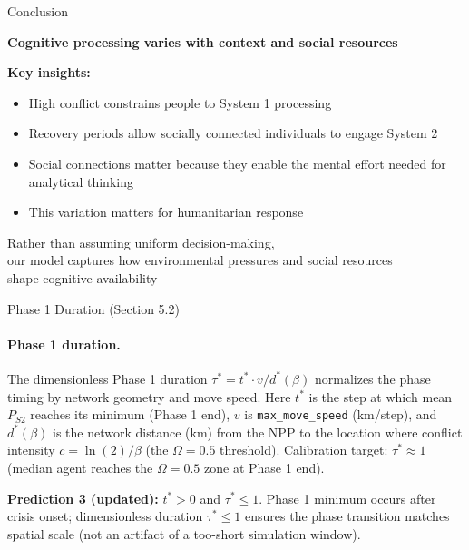 \documentclass[aspectratio=169]{beamer}
\begin{document}
\begin{frame}{Conclusion}

\begin{center}
\Large
\textbf{Cognitive processing varies with context and social resources}
\end{center}

\vspace{1em}

\textbf{Key insights:}
\begin{itemize}
    \item High conflict constrains people to System 1 processing
    \item Recovery periods allow socially connected individuals to engage System 2
    \item Social connections matter because they enable the mental effort needed for analytical thinking
    \item This variation matters for humanitarian response
\end{itemize}

\vspace{1em}

\begin{center}
\large
Rather than assuming uniform decision-making,\\
our model captures how environmental pressures and social resources\\
shape cognitive availability
\end{center}

\end{frame}

\begin{frame}{Phase 1 Duration (Section 5.2)}

\paragraph{Phase 1 duration.} The dimensionless Phase 1 duration
$\tau^* = t^* \cdot v / d^*(\beta)$ normalizes the phase timing by
network geometry and move speed. Here $t^*$ is the step at which
mean $P_{S2}$ reaches its minimum (Phase 1 end), $v$ is
\texttt{max\_move\_speed} (km/step), and $d^*(\beta)$ is the network
distance (km) from the NPP to the location where conflict intensity
$c = \ln(2)/\beta$ (the $\Omega = 0.5$ threshold). Calibration target:
$\tau^* \approx 1$ (median agent reaches the $\Omega = 0.5$ zone at
Phase 1 end).

\vspace{0.5em}
\textbf{Prediction 3 (updated):} $t^* > 0$ and $\tau^* \leq 1$.
Phase 1 minimum occurs after crisis onset; dimensionless duration
$\tau^* \leq 1$ ensures the phase transition matches spatial scale
(not an artifact of a too-short simulation window).

\end{frame}
\end{document}
